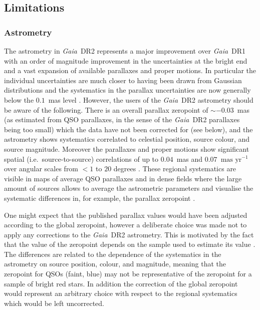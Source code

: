 \documentclass[longauth]{aa_gaia} %
\newcommand\gaia{\textit{Gaia}}
\newcommand\gdr[1]{\gaia~DR#1}
\newcommand\masyr{\ensuremath{\text{mas~yr}^{-1}}}
\begin{document}
\subsection{Limitations}

\subsubsection{Astrometry}
\label{sec:astrometry-limitations}

The astrometry in \gdr{2} represents a major improvement over \gdr{1} with an order of magnitude
improvement in the uncertainties at the bright end and a vast expansion of available parallaxes and
proper motions. In particular the individual uncertainties are much closer to having been drawn from
Gaussian distributions and the systematics in the parallax uncertainties are now generally below the
$0.1$~mas level \citep[as estimated from the analysis of QSO parallaxes,][]{DR2-DPACP-51}. However, the
users of the \gdr{2} astrometry should be aware of the following. There is an overall parallax
zeropoint of $\sim-0.03$~mas (as estimated from QSO parallaxes, in the sense of the \gdr{2}
parallaxes being too small) which the data have not been corrected for (see below), and the
astrometry shows systematics correlated to celestial position, source colour, and source magnitude.
Moreover the parallaxes and proper motions show significant spatial (i.e.\ source-to-source)
correlations of up to $0.04$~mas and $0.07$~{\masyr} over angular scales from $<1$ to $20$ degrees
\citep[see][for a more detailed characterisation of the spatial covariances]{DR2-DPACP-51}. These
regional systematics are visible in maps of average QSO parallaxes and in dense fields where the
large amount of sources allows to average the astrometric parameters and visualise the systematic
differences in, for example, the parallax zeropoint \citep{DR2-DPACP-51,DR2-DPACP-39}.

One might expect that the published parallax values would have been adjusted according to the global
zeropoint, however a deliberate choice was made not to apply any corrections to the \gdr{2}
astrometry. This is motivated by the fact that the value of the zeropoint depends on the sample
used to estimate its value \citep{DR2-DPACP-39}. The differences are related to the dependence of the
systematics in the astrometry on source position, colour, and magnitude, meaning that the zeropoint
for QSOs (faint, blue) may not be representative of the zeropoint for a sample of bright red stars.
In addition the correction of the global zeropoint would represent an arbitrary choice with respect
to the regional systematics which would be left uncorrected.
\end{document}
